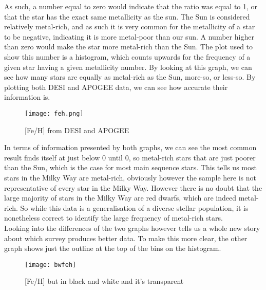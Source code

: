 \documentclass{article}
\begin{document}
\indent As such, a number equal to zero would indicate that the ratio was equal to 1, or that the star has the exact same metallicity as the sun. The Sun is considered relatively metal-rich, and as such it is very common for the metallicity of a star to be negative, indicating it is more metal-poor than our sun. A number higher than zero would make the star more metal-rich than the Sun. The plot used to show this number is a histogram, which counts upwards for the frequency of a given star having a given metallicity number. By looking at this graph, we can see how many stars are equally as metal-rich as the Sun, more-so, or less-so. By plotting both DESI and APOGEE data, we can see how accurate their information is. \begin{figure}[H]
    \centering
    \texttt{[image: feh.png]}
    \caption{[Fe/H] from DESI and APOGEE }
    \label{fig:1}
\end{figure}
\indent In terms of information presented by both graphs, we can see the most common result finds itself at just below 0 until 0, so metal-rich stars that are just poorer than the Sun, which is the case for most main sequence stars. This tells us most stars in the Milky Way are metal-rich, obviously however the sample here is not representative of every star in the Milky Way. However there is no doubt that the large majority of stars in the Milky Way are red dwarfs, which are indeed metal-rich. So while this data is a generalisation of a diverse stellar population, it is nonetheless correct to identify the large frequency of metal-rich stars.\\
\indent Looking into the differences of the two graphs however tells us a whole new story about which survey produces better data. To make this more clear, the other graph shows just the outline at the top of the bins on the histogram.\\
\begin{figure}[h!tbp]
    \centering
    \texttt{[image: bwfeh]}
    \caption{[Fe/H] but in black and white and it's transparent}
    \label{fig:2}
\end{figure}
\end{document}
